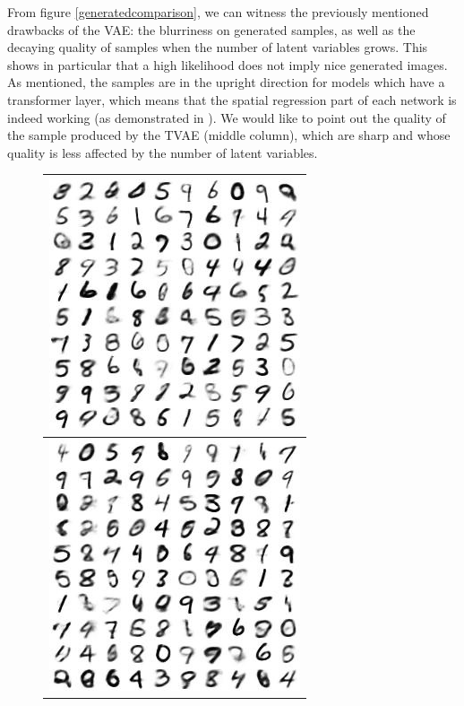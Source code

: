 \documentclass[letterpaper, twoside]{article}
\begin{document}
From figure \ref{generatedcomparison}, we can witness the previously mentioned drawbacks of the VAE: the blurriness on generated samples, as well as the decaying quality of samples when the number of latent variables grows. This shows in particular that a high likelihood does not imply nice generated images. As mentioned, the samples are in the upright direction for models which have a transformer layer, which means that the spatial regression part of each network is indeed working (as demonstrated in \cite{Siyu:vae}). We would like to point out the quality of the sample produced by the TVAE (middle column), which are sharp and whose quality is less affected by the number of latent variables.\\

\begin{figure}[H]
\centering
\begin{minipage}{.33\textwidth}
\begin{flushleft}
\begin{tabular}{|@{}c@{}|}\hline
\includegraphics[scale=1]{manifold_119.jpg}\\ \hline
\includegraphics[scale=1]{manifold_120.jpg}\\\hline

\end{tabular}
\end{flushleft}
\end{minipage}
\end{figure}
\end{document}
